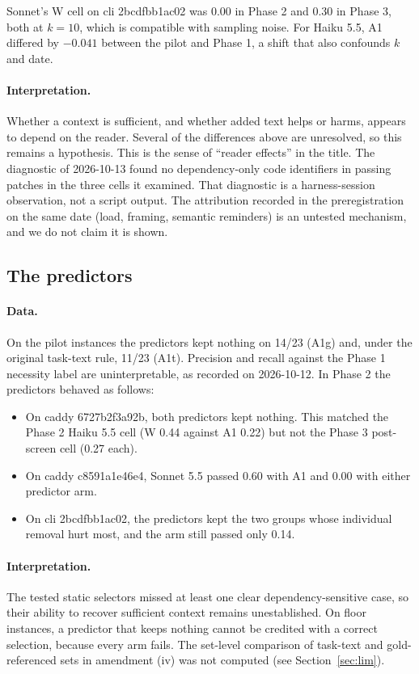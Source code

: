 Sonnet's W cell on cli 2bcdfbb1ac02 was 0.00 in Phase 2 and 0.30 in Phase 3, both at $k=10$, which is compatible with sampling noise. For Haiku 5.5, A1 differed by $-0.041$ between the pilot and Phase 1, a shift that also confounds $k$ and date.

\paragraph{Interpretation.} Whether a context is sufficient, and whether added text helps or harms, appears to depend on the reader. Several of the differences above are unresolved, so this remains a hypothesis. This is the sense of ``reader effects'' in the title. The diagnostic of 2026-10-13 found no dependency-only code identifiers in passing patches in the three cells it examined. That diagnostic is a harness-session observation, not a script output. The attribution recorded in the preregistration on the same date (load, framing, semantic reminders) is an untested mechanism, and we do not claim it is shown.

\subsection{The predictors}

\paragraph{Data.} On the pilot instances the predictors kept nothing on 14/23 (A1g) and, under the original task-text rule, 11/23 (A1t). Precision and recall against the Phase 1 necessity label are uninterpretable, as recorded on 2026-10-12. In Phase 2 the predictors behaved as follows:
\begin{itemize}
\item On caddy 6727b2f3a92b, both predictors kept nothing. This matched the Phase 2 Haiku 5.5 cell (W 0.44 against A1 0.22) but not the Phase 3 post-screen cell (0.27 each).
\item On caddy c8591a1e46e4, Sonnet 5.5 passed 0.60 with A1 and 0.00 with either predictor arm.
\item On cli 2bcdfbb1ac02, the predictors kept the two groups whose individual removal hurt most, and the arm still passed only 0.14.
\end{itemize}

\paragraph{Interpretation.} The tested static selectors missed at least one clear dependency-sensitive case, so their ability to recover sufficient context remains unestablished. On floor instances, a predictor that keeps nothing cannot be credited with a correct selection, because every arm fails. The set-level comparison of task-text and gold-referenced sets in amendment (iv) was not computed (see Section~\ref{sec:lim}).

